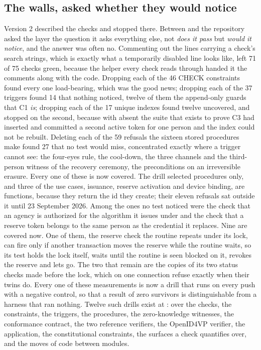 \subsection*{The walls, asked whether they would notice}

Version 2 described the checks and stopped there. Between  and  the
repository asked the layer the question it asks everything else, not \emph{does it pass} but
\emph{would it notice}, and the answer was often no. Commenting out the lines carrying a check's
search strings, which is exactly what a temporarily disabled line looks like, left 71 of 75 checks
green, because the helper every check reads through handed it the comments along with the code.
Dropping each of the 46 CHECK constraints found every one load-bearing, which was the good news;
dropping each of the 37 triggers found 14 that nothing noticed, twelve of them the append-only guards
that C1 \emph{is}; dropping each of the 17 unique indexes found twelve uncovered, and stopped on the
second, because with  absent the suite that exists to prove C3 had
inserted and committed a second active token for one person and the index could not be rebuilt.
Deleting each of the 59 refusals the sixteen stored procedures make found 27 that no test would miss,
concentrated exactly where a trigger cannot see: the four-eyes rule, the cool-down, the three channels
and the third-person witness of the recovery ceremony, the preconditions on an irreversible erasure.
Every one of these is now covered. The drill selected procedures only, and three of the use cases,
issuance, reserve activation and device binding, are functions, because they return the id they
create; their eleven refusals sat outside it until 23 September 2026. Among the ones no test
noticed were the check that an agency is authorized for the algorithm it issues under and the check that a reserve token belongs
to the same person as the credential it replaces. Nine are covered now. One of them, the reserve check the routine repeats under its lock, can
fire only if another transaction moves the reserve while the routine waits, so its test holds the
lock itself, waits until the routine is seen blocked on it, revokes the reserve and lets go. The
two that remain are the copies of its two status checks made before the lock, which on one connection
refuse exactly when their twins do. Every one of these
measurements is now a drill that runs on
every push with a negative control, so that a result of zero survivors is distinguishable from a
harness that ran nothing. Twelve such drills exist at : over the checks, the
constraints, the triggers, the procedures, the zero-knowledge witnesses, the conformance contract, the
two reference verifiers, the OpenID4VP verifier, the application, the constitutional constraints, the
surfaces a check quantifies over, and the moves of code between modules.

